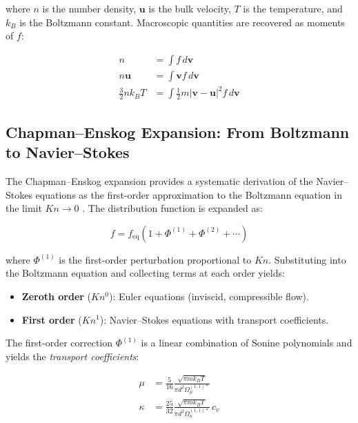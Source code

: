 \noindent where $n$ is the number density, $\mathbf{u}$ is the bulk velocity, $T$ is the temperature, and $k_B$ is the Boltzmann constant. Macroscopic quantities are recovered as moments of $f$:

\begin{align}
    n &= \int f \, d\mathbf{v} \label{eq:moment_density} \\
    n\mathbf{u} &= \int \mathbf{v} f \, d\mathbf{v} \label{eq:moment_momentum} \\
    \frac{3}{2} n k_B T &= \int \frac{1}{2} m |\mathbf{v} - \mathbf{u}|^2 f \, d\mathbf{v} \label{eq:moment_energy}
\end{align}

\subsection{Chapman--Enskog Expansion: From Boltzmann to Navier--Stokes}

The Chapman--Enskog expansion provides a systematic derivation of the Navier--Stokes equations as the first-order approximation to the Boltzmann equation in the limit $Kn \to 0$ \cite{bird1994molecular}. The distribution function is expanded as:

\begin{equation}
    f = f_{\text{eq}} \left( 1 + \Phi^{(1)} + \Phi^{(2)} + \cdots \right)
    \label{eq:chapman_enskog}
\end{equation}

\noindent where $\Phi^{(1)}$ is the first-order perturbation proportional to $Kn$. Substituting into the Boltzmann equation and collecting terms at each order yields:

\begin{itemize}
    \item \textbf{Zeroth order} ($Kn^0$): Euler equations (inviscid, compressible flow).
    \item \textbf{First order} ($Kn^1$): Navier--Stokes equations with transport coefficients.
\end{itemize}

The first-order correction $\Phi^{(1)}$ is a linear combination of Sonine polynomials and yields the \textit{transport coefficients}:

\begin{align}
    \mu &= \frac{5}{16} \frac{\sqrt{\pi m k_B T}}{\pi d^2 \Omega_\mu^{(1,1)*}} \label{eq:chapman_viscosity} \\
    \kappa &= \frac{25}{32} \frac{\sqrt{\pi m k_B T}}{\pi d^2 \Omega_\kappa^{(1,1)*}} \, c_v \label{eq:chapman_conductivity}
\end{align}

